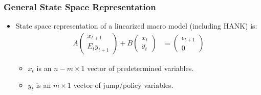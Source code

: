 \documentclass[english,xcolor=svgnames]{beamer}
\begin{document}
\begin{frame}
	\frametitle{General State Space Representation}
	\begin{itemize}
		\item State space representation of a linearized macro model (including HANK) is:
		\begin{align*}
			A \begin{pmatrix} x_{t+1} \\
				E_t y_{t+1}
		\end{pmatrix}
			+ B \begin{pmatrix} x_{t} \\
				y_{t}
		\end{pmatrix} &= \begin{pmatrix} \epsilon_{t+1} \\
			0
	\end{pmatrix}  
		\end{align*}
		\begin{itemize}
			\item $x_t$ is an $n-m\times 1$ vector of predetermined variables.
			\item $y_t$ is an $m\times 1$ vector of jump/policy variables.
		\end{itemize}
	 \end{itemize}
 \end{frame}

 
\end{document}
